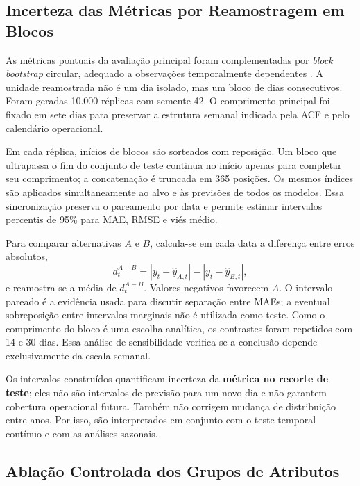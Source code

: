 \subsection{Incerteza das Métricas por Reamostragem em Blocos}\label{sec:metodo_bootstrap}

As métricas pontuais da avaliação principal foram complementadas por \textit{block bootstrap} circular, adequado a observações temporalmente dependentes \cite{lahiri2003resampling}. A unidade reamostrada não é um dia isolado, mas um bloco de dias consecutivos. Foram geradas 10.000 réplicas com semente 42. O comprimento principal foi fixado em sete dias para preservar a estrutura semanal indicada pela ACF e pelo calendário operacional.

Em cada réplica, inícios de blocos são sorteados com reposição. Um bloco que ultrapassa o fim do conjunto de teste continua no início apenas para completar seu comprimento; a concatenação é truncada em 365 posições. Os mesmos índices são aplicados simultaneamente ao alvo e às previsões de todos os modelos. Essa sincronização preserva o pareamento por data e permite estimar intervalos percentis de 95\% para MAE, RMSE e viés médio.

Para comparar alternativas $A$ e $B$, calcula-se em cada data a diferença entre erros absolutos,
\begin{equation}
    d_t^{A-B}=|y_t-\widehat y_{A,t}|-|y_t-\widehat y_{B,t}|,
\end{equation}
e reamostra-se a média de $d_t^{A-B}$. Valores negativos favorecem $A$. O intervalo pareado é a evidência usada para discutir separação entre MAEs; a eventual sobreposição entre intervalos marginais não é utilizada como teste. Como o comprimento do bloco é uma escolha analítica, os contrastes foram repetidos com 14 e 30 dias. Essa análise de sensibilidade verifica se a conclusão depende exclusivamente da escala semanal.

Os intervalos construídos quantificam incerteza da \textbf{métrica no recorte de teste}; eles não são intervalos de previsão para um novo dia e não garantem cobertura operacional futura. Também não corrigem mudança de distribuição entre anos. Por isso, são interpretados em conjunto com o teste temporal contínuo e com as análises sazonais.

\subsection{Ablação Controlada dos Grupos de Atributos}\label{sec:metodo_ablacao}


